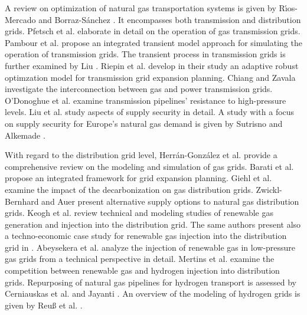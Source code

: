 A review on optimization of natural gas transportation systems is given by R{\'\i}os-Mercado and Borraz-S{\'a}nchez \cite{rios2015optimization}. It encompasses both transmission and distribution grids. Pfetsch et al. \cite{pfetsch2015validation} elaborate in detail on the operation of gas transmission grids. Pambour et al. \cite{pambour2016integrated} propose an integrated transient model approach for simulating the operation of transmission grids. The transient process in transmission grids is further examined by Liu \cite{liu2011coordinated}. Riepin et al. \cite{riepin2022adaptive} develop in their study an adaptive robust optimzation model for transmission grid expansion planning. Chiang and Zavala \cite{chiang2016large} investigate the interconnection between gas and power transmission grids. O'Donoghue et al. \cite{o1997development} examine transmission pipelines' resistance to high-pressure levels. Liu et al. \cite{liu2009security} study aspects of supply security in detail. A study with a focus on supply security for Europe's natural gas demand is given by Sutrisno and Alkemade \cite{sutrisno2020eu}.\vspace{0.3cm}

With regard to the distribution grid level, Herr{\'a}n-Gonz{\'a}lez et al. \cite{herran2009modeling} provide a comprehensive review on the modeling and simulation of gas grids. Barati et al. \cite{barati2014multi} propose an integrated framework for grid expansion planning.  Giehl et al. \cite{giehl2023assessment} examine the impact of the decarbonization on gas distribution grids. Zwickl-Bernhard and Auer \cite{zwickl2022demystifying} present alternative supply options to natural gas distribution grids. Keogh et al. \cite{keogh2022gas} review technical and modeling studies of renewable gas generation and injection into the distribution grid. The same authors present also a techno-economic case study for renewable gas injection into the distribution grid in \cite{keogh2022gas}.  Abeysekera et al. \cite{abeysekera2016steady} analyze the injection of renewable gas in low-pressure gas grids from a technical perspective in detail. Mertins et al. \cite{mertins2023competition} examine the competition between renewable gas and hydrogen injection into distribution grids. Repurposing of natural gas pipelines for hydrogen transport is assessed by Cerniauskas et al. \cite{cerniauskas2020options} and Jayanti \cite{jayanti2022repurposing}. An overview of the modeling of hydrogen grids is given by Reuß et al. \cite{reuss2019modeling}.\vspace{0.3cm}

